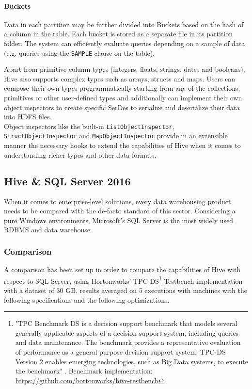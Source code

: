 \paragraph{Buckets} Data in each partition may be further divided into Buckets based on the hash of a column in the table. Each bucket is stored as a separate file in its partition folder. The system can efficiently evaluate queries depending on a sample of data (e.g. queries using the \texttt{SAMPLE} clause on the table).
\newline
\par
Apart from primitive column types (integers, floats, strings, dates and booleans), Hive also supports complex types such as arrays, structs and maps. Users can compose their own types programmatically starting from any of the collections, primitives or other user-defined types and additionally can implement their own object inspectors to create specific SerDes to serialize and deserialize their data into HDFS files.\\
Object inspectors like the built-in \texttt{ListObjectInspector}, \texttt{StructObjectInspector} and \texttt{MapObjectInspector} provide in an extensible manner the necessary hooks to extend the capabilities of Hive when it comes to understanding richer types and other data formats.

\subsection{Hive \& SQL Server 2016}

When it comes to enterprise-level solutions, every data warehousing product needs to be compared with the de-facto standard of this sector. Considering a pure Windows environments, Microsoft's SQL Server is the most widely used RDBMS and data warehouse.\newline

\subsubsection{Comparison}

A comparison has been set up in order to compare the capabilities of Hive with respect to SQL Server, using Hortonworks' TPC-DS\footnote{"TPC Benchmark DS is a decision support benchmark that models several generally applicable aspects of a decision support system, including queries and data maintenance. The benchmark provides a representative evaluation of performance as a general purpose decision support system. TPC-DS Version 2 enables emerging technologies, such as Big Data systems, to execute the benchmark" \cite{tpcds} . Benchmark implementation: \href{https://github.com/hortonworks/hive-testbench}{https://github.com/hortonworks/hive-testbench}} Testbench implementation with a dataset of 30 GB, results averaged on 5 executions with machines with the following specifications and the following optimizations:
\newline

